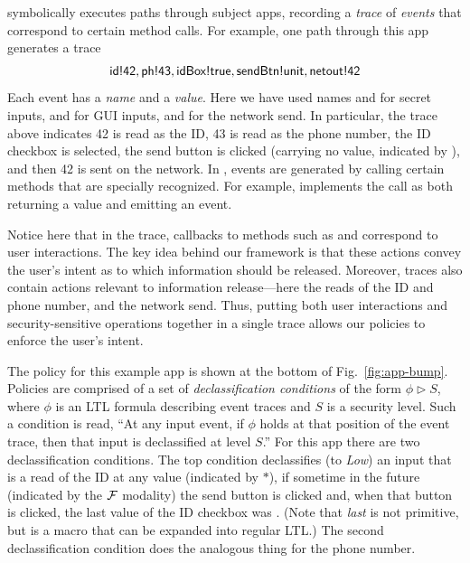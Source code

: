 \toolname{} symbolically executes paths through subject apps, recording a
\emph{trace} of \emph{events} that correspond to certain method calls.
For example, one path through this app generates a trace
\begin{displaymath}
  \textsf{id!42}, \textsf{ph!43}, \textsf{idBox!true},
  \textsf{sendBtn!unit}, \textsf{netout!}\textsf{42}
\end{displaymath}
Each event has a \emph{name} and a \emph{value}. Here we have used
names  and  for secret inputs,  and
 for GUI inputs, and  for the network
send.  In particular, the trace above indicates 42 is read as the ID,
43 is read as the phone number, the ID checkbox is selected, the send
button is clicked (carrying no value, indicated by
), and then 42 is sent on the network. In \toolname{},
events are generated by calling certain methods that are specially
recognized. For example, \toolname{} implements the
 call as both returning a value and emitting
an event.

Notice here that in the trace, callbacks to methods such as
 and  correspond to user
interactions. The key idea behind our framework is that these actions
convey the user's intent as to which information should be
released. Moreover, traces also contain actions relevant to
information release---here the reads of the ID and phone number, and
the network send. Thus, putting both user interactions and
security-sensitive operations together in a single trace allows
our policies to enforce the user's intent.

The policy for
this example app is shown at the bottom of Fig.~\ref{fig:app-bump}.
Policies are comprised of a set of \emph{declassification
  conditions} of the form $\phi \rhd S$, where $\phi$ is an LTL
formula describing event traces and $S$ is a security level.  Such a
condition is read, ``At any input event, if $\phi$ holds at that
position of the event trace, then that input is declassified at level
$S$.''  For this app there are two declassification conditions. The
top condition declassifies (to \emph{Low}) an input that is a
read of the ID at any value (indicated by $\ast$), if
sometime in the future (indicated by the $\mathcal{F}$ modality) the send
button is clicked and, when that button is clicked, the last value of
the ID checkbox was . (Note that \emph{last} is not
primitive, but is a macro that can be expanded into regular LTL.)  The
second declassification condition does the analogous thing for the
phone number.

